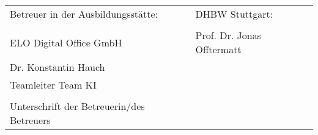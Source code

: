 \begin{spacing}{1}
  \vfill

  \begin{tabular}{ll}
    Betreuer in der Ausbildungsstätte:        & DHBW Stuttgart:                                                    \\
    \hspace{0.4\linewidth}                    &                                                                    \\
    ELO Digital Office GmbH                   & Prof. Dr. Jonas Offtermatt                                          \\
    Dr. Konstantin Hauch
                                              &\\
    Teamleiter Team KI                                                     \\
    \\
    Unterschrift der Betreuerin/des Betreuers                                                                      \\
  \end{tabular}


  \vspace{1cm}
\end{spacing}



